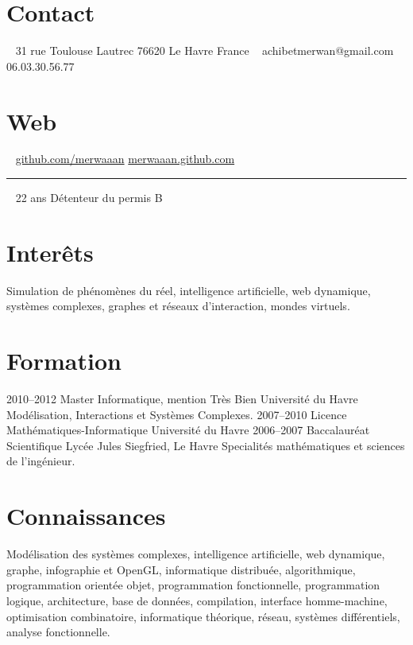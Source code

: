 \documentclass[]{friggeri-cv}
\begin{document}
       {}

\begin{aside}
  \section{Contact}
    ~
    31 rue Toulouse Lautrec
    76620 Le Havre
    France
    ~
    achibetmerwan{}@gmail.com
    ~
    06.03.30.56.77
    \section{Web}
    ~
    \href{http://github.com/merwaaan}{github.com/merwaaan}
    \href{http://merwaaan.github.com}{merwaaan.github.com}
    ~
    {\color{lightergray}\rule{3cm}{0.01cm}}
    ~
    22 ans
    Détenteur du permis B
\end{aside}

\section{Interêts}

Simulation de phénomènes du réel, intelligence artificielle, web
dynamique, systèmes complexes, graphes et réseaux d'interaction,
mondes virtuels.

\section{Formation}

\begin{entrylist}
  \entry
    {2010–2012}
    {Master Informatique, mention Très Bien}
    {Université du Havre}
    {Modélisation, Interactions et Systèmes Complexes.}
  \entry
    {2007–2010}
    {Licence Mathématiques-Informatique}
    {Université du Havre}
    {}
  \entry
    {2006–2007}
    {Baccalauréat Scientifique}
    {Lycée Jules Siegfried, Le Havre}
    {Specialités mathématiques et sciences de l'ingénieur.}
\end{entrylist}

\section{Connaissances}

Modélisation des systèmes complexes, intelligence artificielle, web
dynamique, graphe, infographie et OpenGL, informatique distribuée,
algorithmique, programmation orientée objet, programmation
fonctionnelle, programmation logique, architecture, base de données,
compilation, interface homme-machine, optimisation combinatoire,
informatique théorique, réseau, systèmes différentiels, analyse
fonctionnelle.
\end{document}
